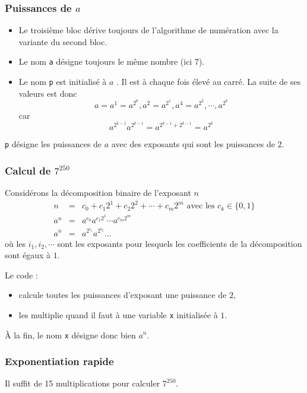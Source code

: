 \begin{frame}
  \frametitle{Puissances de $a$}
\begin{itemize}
  \item Le troisième bloc dérive toujours de l'algorithme de numération avec la variante du second bloc.
  \item Le nom \texttt{a} désigne toujours le même nombre (ici $7$).
  \item Le nom \texttt{p} est initialisé à $a$ . Il est à chaque fois élevé au carré. La suite de ses valeurs est donc
\begin{displaymath}
 a=a^{1}=a^{2^{0}}, a^2=a^{2^{1}}, a^4=a^{2^{2}}, \cdots , a^{2^{k}}
\end{displaymath}
car 
\begin{displaymath}
 a^{2^{k-1}}a^{2^{k-1}}= a^{2^{k-1} + 2^{k-1}}=a^{2^{k}}
\end{displaymath}
\end{itemize}
\texttt{p} désigne les puissances de $a$ avec des exposants qui sont les puissances de $2$.
\end{frame}

\begin{frame}
  \frametitle{Calcul de $7^{250}$}
Considérons la décomposition binaire de l'exposant $n$
\begin{eqnarray*}
 n &=& c_0 + c_1 2^1 + c_2 2^2+ \cdots +c_m 2^m \text{ avec les } c_k\in\{0,1\}\\
 a^n &=& a^{c_0}a^{c_1 2^1} \cdots a^{c_m 2^m} \\
 a^n &=& a^{2^{i_1}} a^{2^{i_2}} ...
\end{eqnarray*}
où les $i_1, i_2, \cdots$ sont les exposants pour lesquels les coefficients de la décomposition sont égaux à $1$.

Le code :\begin{itemize}
  \item calcule toutes les puissances d'exposant une puissance de $2$,
  \item les multiplie quand il faut à une variable \texttt{x} initialisée à $1$.
\end{itemize}
\`A la fin, le nom \texttt{x} désigne donc bien $a^n$.
\end{frame}

\begin{frame}
  \frametitle{Exponentiation rapide}
  
Il suffit de 15 multiplications pour calculer $7^{250}$.
\end{frame}

